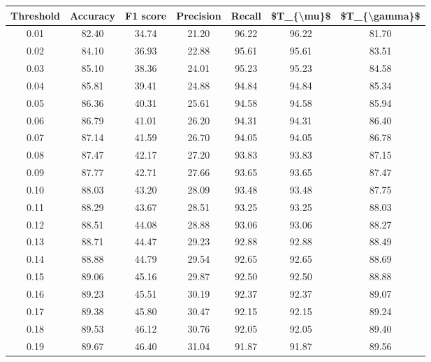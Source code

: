 \begin{tabular}{|c|c|c|c|c|c|c|}
\hline
 Threshold &  Accuracy &  F1 score &  Precision &  Recall &  \$T\_\{\textbackslash mu\}\$ &  \$T\_\{\textbackslash gamma\}\$ \\
\hline
      0.01 &     82.40 &     34.74 &      21.20 &   96.22 &      96.22 &         81.70 \\
      0.02 &     84.10 &     36.93 &      22.88 &   95.61 &      95.61 &         83.51 \\
      0.03 &     85.10 &     38.36 &      24.01 &   95.23 &      95.23 &         84.58 \\
      0.04 &     85.81 &     39.41 &      24.88 &   94.84 &      94.84 &         85.34 \\
      0.05 &     86.36 &     40.31 &      25.61 &   94.58 &      94.58 &         85.94 \\
      0.06 &     86.79 &     41.01 &      26.20 &   94.31 &      94.31 &         86.40 \\
      0.07 &     87.14 &     41.59 &      26.70 &   94.05 &      94.05 &         86.78 \\
      0.08 &     87.47 &     42.17 &      27.20 &   93.83 &      93.83 &         87.15 \\
      0.09 &     87.77 &     42.71 &      27.66 &   93.65 &      93.65 &         87.47 \\
      0.10 &     88.03 &     43.20 &      28.09 &   93.48 &      93.48 &         87.75 \\
      0.11 &     88.29 &     43.67 &      28.51 &   93.25 &      93.25 &         88.03 \\
      0.12 &     88.51 &     44.08 &      28.88 &   93.06 &      93.06 &         88.27 \\
      0.13 &     88.71 &     44.47 &      29.23 &   92.88 &      92.88 &         88.49 \\
      0.14 &     88.88 &     44.79 &      29.54 &   92.65 &      92.65 &         88.69 \\
      0.15 &     89.06 &     45.16 &      29.87 &   92.50 &      92.50 &         88.88 \\
      0.16 &     89.23 &     45.51 &      30.19 &   92.37 &      92.37 &         89.07 \\
      0.17 &     89.38 &     45.80 &      30.47 &   92.15 &      92.15 &         89.24 \\
      0.18 &     89.53 &     46.12 &      30.76 &   92.05 &      92.05 &         89.40 \\
      0.19 &     89.67 &     46.40 &      31.04 &   91.87 &      91.87 &         89.56 \\

\end{tabular}
